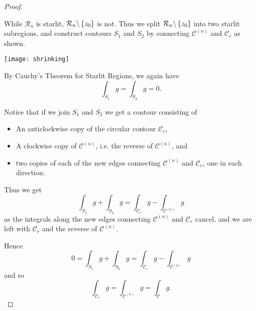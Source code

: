 \begin{proof}

\begin{absolutelynopagebreak}
While $\mathcal{R}_n$ is starlit, $\mathcal{R}_n \backslash \left\{z_0\right\}$ is not.  Thus we split $\mathcal{R}_n \backslash \left\{z_0\right\}$ into two starlit subregions, and construct contours $S_1$ and $S_2$ by connecting $\mathcal{C}^{(n)}$ and $\mathcal{C}_r$ as shown.
\begin{center}
\texttt{[image: shrinking]}
\end{center}
\end{absolutelynopagebreak}

By Cauchy's Theorem for Starlit Regions, we again have
\[
\int_{S_1} g = \int_{S_2} g = 0.
\]

Notice that if we join $S_1$ and $S_2$ we get a contour consisting of
\begin{itemize}
\item An anticlockwise copy of the circular contour $\mathcal{C}_r$, 
\item A clockwise copy of $\mathcal{C}^{(n)}$, i.e. the reverse of $\mathcal{C}^{(n)}$, and
\item two copies of each of the new edges connecting $\mathcal{C}^{(n)}$ and $\mathcal{C}_r$, one in each direction.
\end{itemize}
Thus we get
\[
\int_{S_1} g + \int_{S_2} g = \int_{\mathcal{C}_r} g - \int_{\mathcal{C}^{(n)}} g
\]
as the integrals along the new edges connecting $\mathcal{C}^{(n)}$ and $\mathcal{C}_r$ cancel, and we are left with $\mathcal{C}_r$ and the reverse of $\mathcal{C}^{(n)}$.
  
Hence
\[
0 = \int_{S_1} g + \int_{S_2} g = \int_{\mathcal{C}_r} g - \int_{\mathcal{C}^{(n)}} g
\]
and so
\[
\int_{\mathcal{C}_r} g = \int_{\mathcal{C}^{(n)}} g = \int_{\mathcal{C}} g.
\]


\end{proof}

\endinput

A very similar argument is used to prove Cauchy's Theorem for Simply Connected Regions (which we stated previously as Theorem~\ref{t:cauchysc}).

\begin{theorem}[Cauchy's Theorem for Simply Connected Regions]
Let $f$ be a function that is holomorphic in a simply connected region $\mathcal{R}$, and let $\mathcal{C}$ be a closed contour in $\mathcal{R}$. Then
\[
\int_{\mathcal{C}} f = 0.
\]
\end{theorem}
\begin{proof}
This is identical to the Proof of Theorem~\ref{t:sc}, except that now, $f$ is holomorphic on the starlit region $\mathcal{R}_n$, so that
\[
\int_{\mathcal{C}} f = \int_{\mathcal{C}_r} f =0.
\]
\end{proof}


